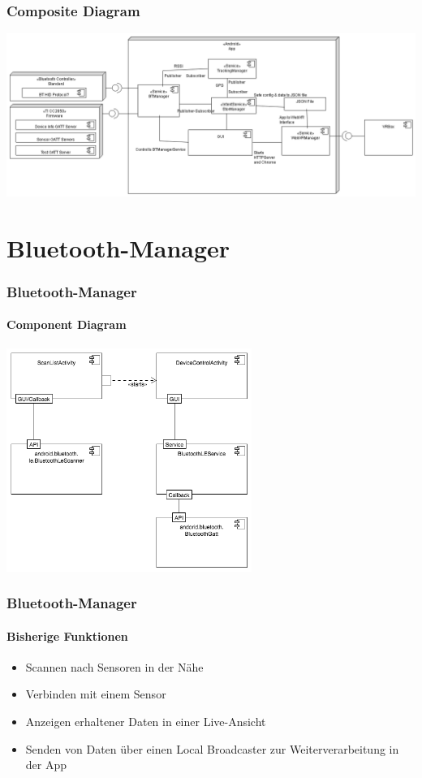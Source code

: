 \documentclass{beamer}
\begin{document}
\begin{frame}
\frametitle{Composite Diagram}
\includegraphics[width=\textwidth]{../doc/SDD/pics/composite_app.png}
\end{frame}

\section{Bluetooth-Manager}

\begin{frame}
\frametitle{Bluetooth-Manager}
\framesubtitle{Component Diagram}
\hspace{2cm} \includegraphics[width=0.6\textwidth]{../doc/SDD/pics/ble_man.png}
\end{frame}

\begin{frame}
\frametitle{Bluetooth-Manager}
\framesubtitle{Bisherige Funktionen}
\begin{itemize}
  \item Scannen nach Sensoren in der N\"ahe
  \item Verbinden mit einem Sensor
  \item Anzeigen erhaltener Daten in einer Live-Ansicht
  \item Senden von Daten \"uber einen Local Broadcaster zur Weiterverarbeitung in der App
\end{itemize}
\end{frame}
\end{document}
